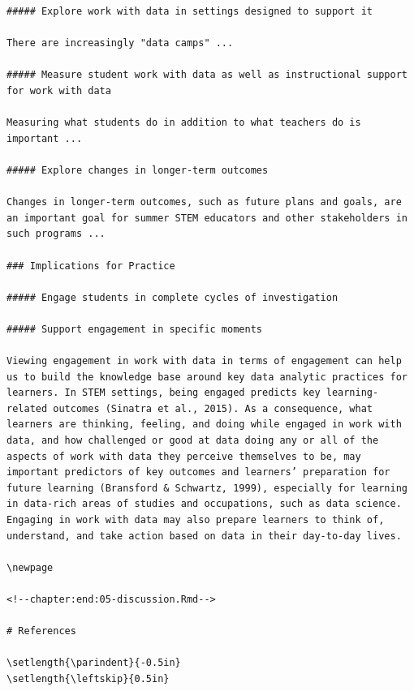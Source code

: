 \documentclass[]{book}
\theoremstyle{definition}
\theoremstyle{definition}
\theoremstyle{definition}
\theoremstyle{remark}
\begin{document}
\begin{verbatim}
##### Explore work with data in settings designed to support it

There are increasingly "data camps" ...

##### Measure student work with data as well as instructional support for work with data

Measuring what students do in addition to what teachers do is important ...

##### Explore changes in longer-term outcomes

Changes in longer-term outcomes, such as future plans and goals, are an important goal for summer STEM educators and other stakeholders in such programs ...

### Implications for Practice

##### Engage students in complete cycles of investigation

##### Support engagement in specific moments

Viewing engagement in work with data in terms of engagement can help us to build the knowledge base around key data analytic practices for learners. In STEM settings, being engaged predicts key learning-related outcomes (Sinatra et al., 2015). As a consequence, what learners are thinking, feeling, and doing while engaged in work with data, and how challenged or good at data doing any or all of the aspects of work with data they perceive themselves to be, may important predictors of key outcomes and learners’ preparation for future learning (Bransford & Schwartz, 1999), especially for learning in data-rich areas of studies and occupations, such as data science. Engaging in work with data may also prepare learners to think of, understand, and take action based on data in their day-to-day lives.

\newpage

<!--chapter:end:05-discussion.Rmd-->

# References

\setlength{\parindent}{-0.5in}
\setlength{\leftskip}{0.5in}


\end{verbatim}
\end{document}
